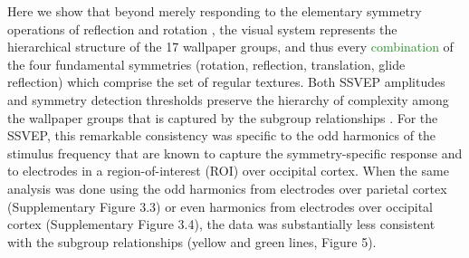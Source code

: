 \documentclass[11pt, twoside]{article}
\begin{document}
Here we show that beyond merely responding to the elementary symmetry operations of reflection \citep{Sasaki_2005, Tyler_2005} and rotation \citep{RN1725}, the visual system represents the hierarchical structure of the 17 wallpaper groups, and thus every \textcolor{ForestGreen}{combination} of the four fundamental symmetries (rotation, reflection, translation, glide reflection) which comprise the set of regular textures. Both SSVEP amplitudes and symmetry detection thresholds preserve the hierarchy of complexity among the wallpaper groups that is captured by the subgroup relationships \citep{RN1711}. For the SSVEP, this remarkable consistency was specific to the odd harmonics of the stimulus frequency that are known to capture the symmetry-specific response \citep{RN1725} and to electrodes in a region-of-interest (ROI) over occipital cortex. When the same analysis was done using the odd harmonics from electrodes over parietal cortex (Supplementary Figure 3.3) or even harmonics from electrodes over occipital cortex (Supplementary Figure 3.4), the data was substantially less consistent with the subgroup relationships (yellow and green lines, Figure 5).
\end{document}
